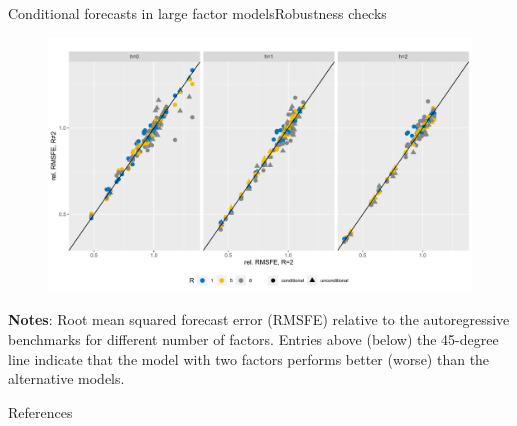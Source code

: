 \documentclass[xcolor=svgnames, 10pt, aspectratio=169]{beamer}
\begin{document}
\begin{frame}{Conditional forecasts in large factor models}{Robustness checks}
    \begin{figure}
        \includegraphics[scale = 0.40]{fig_eval_robustness_Nr.pdf}  \vspace{0.1cm} \\
    \end{figure}

    \begin{adjustbox}{minipage=0.75\textwidth,center}
        {\tiny \textbf{Notes}: Root mean squared forecast error (RMSFE) relative to the autoregressive benchmarks for different number of factors. Entries above (below) the 45-degree line indicate that the model with two factors performs better (worse) than the alternative models.}\par
\end{adjustbox}  
\end{frame}

\begin{frame}[t]{References}
    \scriptsize     
    
    
\end{frame}
\end{document}
